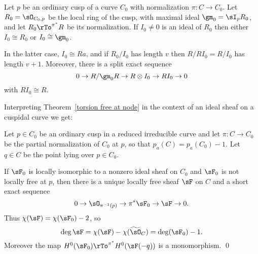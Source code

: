 
\begin{theorem}\label{torsion free at node}
Let $p$ be an ordinary cusp of a curve $C_0$ with normalization $\pi: C \to C_0$. Let $R_0 = \sO_{C_0,p}$ be the local ring of the cusp, with maximal ideal $\gm_0 = \sI_{p}R_{0}$,
and let $R_{0}\rTo^{\pi^{*}} R$ be its normalization.  If $I_{0}\neq 0$ is an ideal of $R_{0}$ then 
either $I_{0}\cong R_{0}$ or $I_{0}\cong \gm_0$.

 In the latter case, $I_{0} \cong Ra$, and if $R_{0}/I_{0}$ has length $v$ then $R/RI_{0} = R/I_{0}$ has length $v+1$.
 Moreover,
there is a split exact sequence
$$
0\to R/\gm_0 R \to R \otimes I_{0}  \to R I_{0} \to 0
$$
with $RI_{0}  \cong R$.
\end{theorem}

Interpreting Theorem~\ref{torsion free at node} in the context of an ideal sheaf on a cuspidal curve
we get:

\begin{corollary}
Let $p\in C_{0}$ be an ordinary cusp in a reduced irreducible curve and let $\pi:C \to C_{0}$ be 
the partial normalization of $C_{0}$ at $p$, so that $p_a(C) = p_a(C_{0}) -1$.
Let $q\in C$ be the point lying over $p\in C_{0}$.

If $\sF_0$ is locally
isomorphic to a nonzero ideal sheaf on $C_{0}$
and $\sF_0$ is not locally free at $p$, then there is 
a unique locally free sheaf $\sF$ on $C$ and a short exact sequence
$$
0\to \sO_{\pi^{-1}(p)} \to \pi^{*} \sF_{0} \to \sF \to 0.
$$
Thus $\chi(\sF) = \chi(\sF_{0}) -2$, so 
$$
\deg \sF = \chi(\sF) - \chi(\widetilde \sO_{C}) = 
\deg(\sF_{0})-1.
$$
Moreover the map $H^{0}(\sF_{0}) \rTo^{\pi^{*}} H^{0}(\sF(-q))$ is a monomorphism. 
\qed
\end{corollary}

